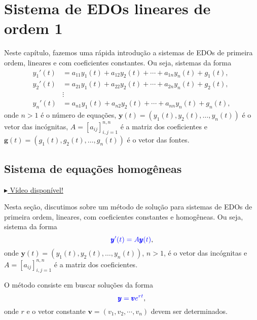 
\chapter{Sistema de EDOs lineares de ordem 1}\label{cap_edosis1}

Neste capítulo, fazemos uma rápida introdução a sistemas de EDOs de primeira ordem, lineares e com coeficientes constantes. Ou seja, sistemas da forma
\begin{align}
  y_1'(t) &= a_{11}y_1(t) + a_{12}y_2(t) + \cdots + a_{1n}y_n(t) + g_1(t), \\
  y_2'(t) &= a_{21}y_1(t) + a_{22}y_2(t) + \cdots + a_{2n}y_n(t) + g_2(t), \\
  &\vdots \\
  y_n'(t) &= a_{n1}y_1(t) + a_{n2}y_2(t) + \cdots + a_{nn}y_n(t) + g_n(t),
\end{align}
onde $n>1$ é o número de equações, $\pmb{y}(t) = \left(y_1(t), y_2(t),\dotsc, y_n(t)\right)$ é o vetor das incógnitas, $A = [a_{ij}]_{i,j=1}^{n,n}$ é a matriz dos coeficientes e $\pmb{g}(t) = (g_1(t), g_2(t), \dotsc, g_n(t))$ é o vetor das fontes.

\section{Sistema de equações homogêneas}\label{cap_edosis1_sec_eqh}

\begin{flushright}
  \href{https://archive.org/details/sistema-edo-intro}{$\blacktriangleright$ Vídeo disponível!}
\end{flushright}

Nesta seção, discutimos sobre um método de solução para sistemas de EDOs de primeira ordem, lineares, com coeficientes constantes e homogêneas. Ou seja, sistema da forma
\begin{equation}\label{eq:edosis1_eqh}
  {\color{blue}\pmb{y}'(t) = A\pmb{y}(t)},
\end{equation}
onde $\pmb{y}(t) = \left(y_1(t), y_2(t),\dotsc, y_n(t)\right)$, $n>1$, é o vetor das incógnitas e $A = [a_{ij}]_{i,j=1}^{n,n}$ é a matriz dos coeficientes.

O método consiste em buscar soluções da forma
\begin{equation}
  {\color{blue}\pmb{y} = \pmb{v}e^{rt}},
\end{equation}
onde $r$ e o vetor constante $\pmb{v} = (v_1, v_2, \cdots, v_n)$ devem ser determinados.

